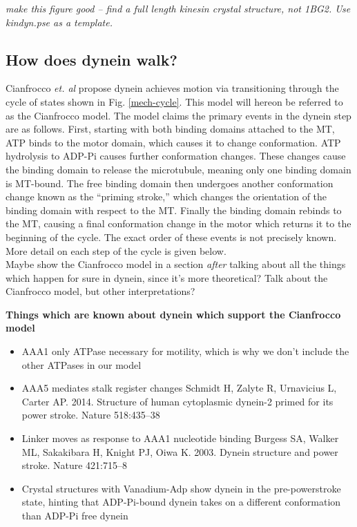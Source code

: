 \documentclass[10pt]{article} %
\begin{document}
\textit{make this figure good -- find a full length kinesin crystal structure, not 1BG2. Use kindyn.pse as a template.}

\subsection{How does dynein walk?}

Cianfrocco \textit{et. al} \cite{cianfroccoreview} propose dynein achieves motion via transitioning through the cycle of states shown in Fig. \ref{mech-cycle}. This model will hereon be referred to as the Cianfrocco model. The model claims the primary events in the dynein step are as follows. First, starting with both binding domains attached to the MT, ATP binds to the motor domain, which causes it to change conformation. ATP hydrolysis to ADP-Pi causes further conformation changes. These changes cause the binding domain to release the microtubule, meaning only one binding domain is MT-bound. The free binding domain then undergoes another conformation change known as the ``priming stroke,'' which changes the orientation of the binding domain with respect to the MT. Finally the binding domain rebinds to the MT, causing a final conformation change in the motor which returns it to the beginning of the cycle. The exact order of these events is not precisely known. More detail on each step of the cycle is given below.\\

Maybe show the Cianfrocco model in a section \textit{after} talking about all the things which happen for sure in dynein, since it's more theoretical? Talk about the Cianfrocco model, but other interpretations?

\textbf{Things which are known about dynein which support the Cianfrocco model}
\begin{itemize}
\item AAA1 only ATPase necessary for motility, which is why we don't include the other ATPases in our model \cite{cianfroccoreview}
\item AAA5 mediates stalk register changes Schmidt H, Zalyte R, Urnavicius L, Carter AP. 2014. Structure of human cytoplasmic dynein-2 primed for
  its power stroke. Nature 518:435–38
\item Linker moves as response to AAA1 nucleotide binding Burgess SA, Walker ML, Sakakibara H, Knight PJ, Oiwa K. 2003. Dynein structure and power stroke. Nature
  421:715–8
\item Crystal structures with Vanadium-Adp show dynein in the pre-powerstroke state, hinting that ADP-Pi-bound dynein takes on a different conformation than ADP-Pi free dynein
\end{itemize}
\end{document}
